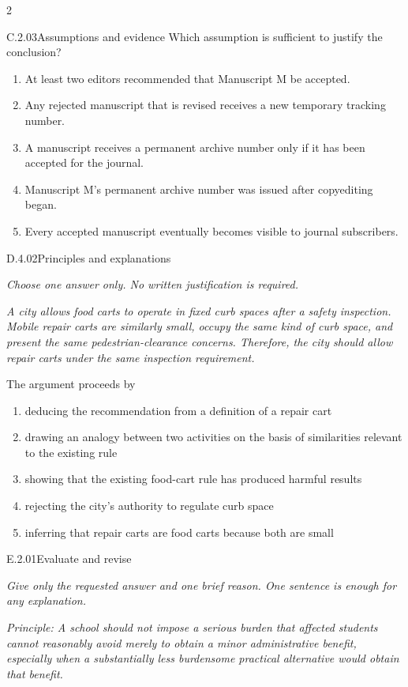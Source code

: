 \documentclass[9pt]{extarticle}
\newcommand{\choice}[1]{\item #1}
\begin{document}
\begin{multicols}{2}
\begin{DenseCoreProblem}{C.2.03}{Assumptions and evidence}
Which assumption is sufficient to justify the conclusion?
\begin{enumerate}[label=(\alph*)]
  \choice{At least two editors recommended that Manuscript M be accepted.}
  \choice{Any rejected manuscript that is revised receives a new temporary tracking number.}
  \choice{A manuscript receives a permanent archive number only if it has been accepted for the journal.}
  \choice{Manuscript M's permanent archive number was issued after copyediting began.}
  \choice{Every accepted manuscript eventually becomes visible to journal subscribers.}
\end{enumerate}
\end{DenseCoreProblem}
\begin{DenseCoreProblem}{D.4.02}{Principles and explanations}
{\scriptsize\textit{Choose one answer only. No written justification is required.}\par}
\emph{A city allows food carts to operate in fixed curb spaces after a safety inspection. Mobile repair carts are similarly small, occupy the same kind of curb space, and present the same pedestrian-clearance concerns. Therefore, the city should allow repair carts under the same inspection requirement.}

The argument proceeds by
\begin{enumerate}[label=(\alph*)]
  \choice{deducing the recommendation from a definition of a repair cart}
  \choice{drawing an analogy between two activities on the basis of similarities relevant to the existing rule}
  \choice{showing that the existing food-cart rule has produced harmful results}
  \choice{rejecting the city's authority to regulate curb space}
  \choice{inferring that repair carts are food carts because both are small}
\end{enumerate}
\end{DenseCoreProblem}
\begin{DenseCoreProblem}{E.2.01}{Evaluate and revise}
{\scriptsize\textit{Give only the requested answer and one brief reason. One sentence is enough for any explanation.}\par}
\emph{Principle: A school should not impose a serious burden that affected students cannot reasonably avoid merely to obtain a minor administrative benefit, especially when a substantially less burdensome practical alternative would obtain that benefit.}


\end{DenseCoreProblem}
\end{multicols}
\end{document}

